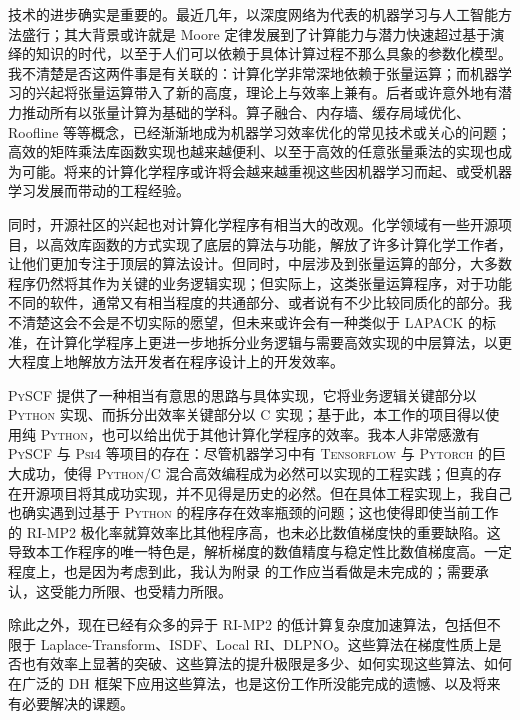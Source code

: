 技术的进步确实是重要的。最近几年，以深度网络为代表的机器学习与人工智能方法盛行；其大背景或许就是 Moore 定律发展到了计算能力与潜力快速超过基于演绎的知识的时代，以至于人们可以依赖于具体计算过程不那么具象的参数化模型。我不清楚是否这两件事是有关联的：计算化学非常深地依赖于张量运算；而机器学习的兴起将张量运算带入了新的高度，理论上与效率上兼有。后者或许意外地有潜力推动所有以张量计算为基础的学科。算子融合、内存墙、缓存局域优化、Roofline 等等概念，已经渐渐地成为机器学习效率优化的常见技术或关心的问题；高效的矩阵乘法库函数实现也越来越便利\cite{vanZee-vandeGeijn.ATMS.2015}、以至于高效的任意张量乘法的实现也成为可能\cite{Matthews-Matthews.SJSC.2018}。将来的计算化学程序或许将会越来越重视这些因机器学习而起、或受机器学习发展而带动的工程经验。

同时，开源社区的兴起也对计算化学程序有相当大的改观。化学领域有一些开源项目，以高效库函数的方式实现了底层的算法与功能\cite{Valeyev.libint, Lehtola-Marques.S.2018, Sun-Sun.JCC.2015}，解放了许多计算化学工作者，让他们更加专注于顶层的算法设计。但同时，中层涉及到张量运算的部分，大多数程序仍然将其作为关键的业务逻辑实现；但实际上，这类张量运算程序，对于功能不同的软件，通常又有相当程度的共通部分、或者说有不少比较同质化的部分。我不清楚这会不会是不切实际的愿望，但未来或许会有一种类似于 LAPACK 的标准，在计算化学程序上更进一步地拆分业务逻辑与需要高效实现的中层算法，以更大程度上地解放方法开发者在程序设计上的开发效率。

\textsc{PySCF} 提供了一种相当有意思的思路与具体实现，它将业务逻辑关键部分以 \textsc{Python} 实现、而拆分出效率关键部分以 C 实现\cite{Sun-Chan.WCMS.2018, Sun-Chan.JCP.2020}；基于此，本工作的项目得以使用纯 \textsc{Python}，也可以给出优于其他计算化学程序的效率。我本人非常感激有 \textsc{PySCF} 与 \textsc{Psi4} 等项目的存在：尽管机器学习中有 \textsc{Tensorflow} 与 \textsc{Pytorch} 的巨大成功，使得 \textsc{Python/C} 混合高效编程成为必然可以实现的工程实践；但真的存在开源项目将其成功实现，并不见得是历史的必然。但在具体工程实现上，我自己也确实遇到过基于 \textsc{Python} 的程序存在效率瓶颈的问题；这也使得即使当前工作的 RI-MP2 极化率就算效率比其他程序高，也未必比数值梯度快的重要缺陷。这导致本工作程序的唯一特色是，解析梯度的数值精度与稳定性比数值梯度高。一定程度上，也是因为考虑到此，我认为附录  的工作应当看做是未完成的；需要承认，这受能力所限、也受精力所限。

除此之外，现在已经有众多的异于 RI-MP2 的低计算复杂度加速算法，包括但不限于 Laplace-Transform\cite{Almloef-Almloef.CPL.1991}、ISDF\cite{Dong-Lin.JCTC.2018, Qin-Yang.JPCA.2020}、Local RI\cite{Ihrig-Blum.NJP.2015}、DLPNO\cite{Riplinger-Neese.JCP.2013, Pinski-Neese.JCP.2015}。这些算法在梯度性质上是否也有效率上显著的突破、这些算法的提升极限是多少、如何实现这些算法、如何在广泛的 DH 框架下应用这些算法，也是这份工作所没能完成的遗憾、以及将来有必要解决的课题。

